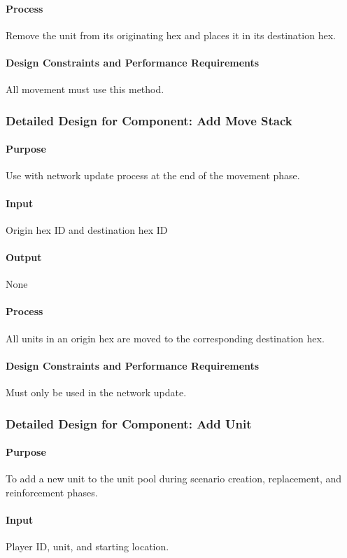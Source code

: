 \documentclass[12pt,a4paper,titlepage]{article}
\begin{document}
\paragraph{Process} Remove the unit from its originating hex and places it in its destination hex.
\paragraph{Design Constraints and Performance Requirements} All movement must use this method.

\subsubsection{Detailed Design for Component: Add Move Stack}
\paragraph{Purpose} Use with network update process at the end of the movement phase.
\paragraph{Input} Origin hex ID and destination hex ID
\paragraph{Output} None
\paragraph{Process} All units in an origin hex are moved to the corresponding destination hex.
\paragraph{Design Constraints and Performance Requirements} Must only be used in the network update.

\subsubsection{Detailed Design for Component: Add Unit}
\paragraph{Purpose} To add a new unit to the unit pool during scenario creation, replacement, and reinforcement phases.
\paragraph{Input} Player ID, unit, and starting location.
\end{document}
